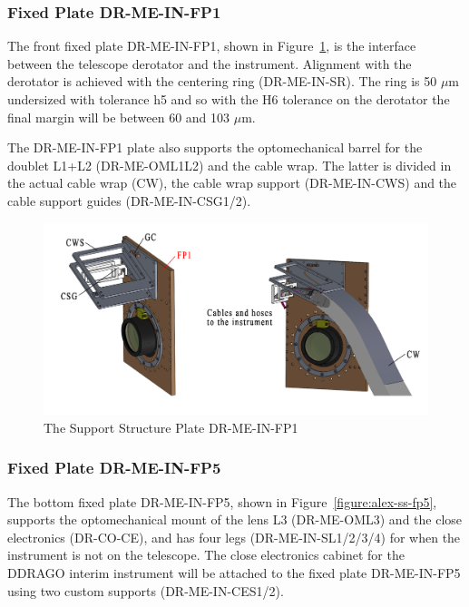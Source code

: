 \documentclass{article}
\newcommand{\micron}{\mbox{$\mu$m}}
\begin{document}
\subsubsection{Fixed Plate DR-ME-IN-FP1}

The front fixed plate DR-ME-IN-FP1, shown in Figure~\ref{figure:alex-ss-fp1}, is the interface between the telescope derotator and the instrument. Alignment with the derotator is achieved with the centering ring (DR-ME-IN-SR). The ring is 50 {\micron} undersized with tolerance h5 and so with the H6 tolerance on the derotator the final margin will be between 60 and 103 {\micron}.

The DR-ME-IN-FP1 plate also supports the optomechanical barrel for the doublet L1+L2 (DR-ME-OML1L2) and the cable wrap. The latter is divided in the actual cable wrap (CW), the cable wrap support (DR-ME-IN-CWS) and the cable support guides (DR-ME-IN-CSG1/2).

\begin{figure}
\begin{center}
\includegraphics[width=\linewidth]{newfigures/Fig3_5.png}
\end{center}
\caption{The Support Structure Plate DR-ME-IN-FP1}
\label{figure:alex-ss-fp1}
\end{figure}

\subsubsection{Fixed Plate DR-ME-IN-FP5}

The bottom fixed plate DR-ME-IN-FP5, shown in Figure~\ref{figure:alex-ss-fp5}, supports the optomechanical mount of the lens L3 (DR-ME-OML3) and the close electronics (DR-CO-CE), and has four legs (DR-ME-IN-SL1/2/3/4) for when the instrument is not on the telescope. The close electronics cabinet for the DDRAGO interim instrument will be attached to the fixed plate DR-ME-IN-FP5 using two custom supports (DR-ME-IN-CES1/2).
\end{document}

